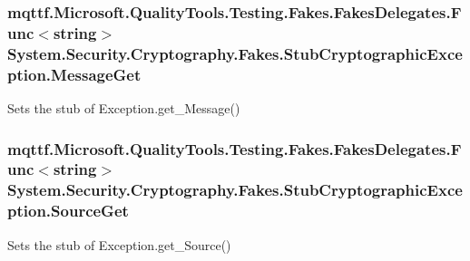 \hypertarget{class_system_1_1_security_1_1_cryptography_1_1_fakes_1_1_stub_cryptographic_exception_ad4d97606b2e65bade10a03cf7d8cc2d8}{
\subsubsection[{Message\-Get}]{\setlength{\rightskip}{0pt plus 5cm}mqttf.\-Microsoft.\-Quality\-Tools.\-Testing.\-Fakes.\-Fakes\-Delegates.\-Func$<$string$>$ System.\-Security.\-Cryptography.\-Fakes.\-Stub\-Cryptographic\-Exception.\-Message\-Get}}\label{class_system_1_1_security_1_1_cryptography_1_1_fakes_1_1_stub_cryptographic_exception_ad4d97606b2e65bade10a03cf7d8cc2d8}


Sets the stub of Exception.\-get\-\_\-\-Message()

\hypertarget{class_system_1_1_security_1_1_cryptography_1_1_fakes_1_1_stub_cryptographic_exception_a8019a63b8e4c1b462f477a731292e7b8}{
\subsubsection[{Source\-Get}]{\setlength{\rightskip}{0pt plus 5cm}mqttf.\-Microsoft.\-Quality\-Tools.\-Testing.\-Fakes.\-Fakes\-Delegates.\-Func$<$string$>$ System.\-Security.\-Cryptography.\-Fakes.\-Stub\-Cryptographic\-Exception.\-Source\-Get}}\label{class_system_1_1_security_1_1_cryptography_1_1_fakes_1_1_stub_cryptographic_exception_a8019a63b8e4c1b462f477a731292e7b8}


Sets the stub of Exception.\-get\-\_\-\-Source()

